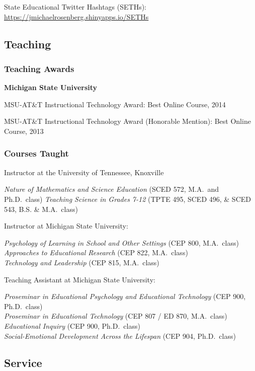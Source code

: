 \documentclass[]{article}
\begin{document}
State Educational Twitter Hashtags (SETHs):
\href{https://jmichaelrosenberg.shinyapps.io/SETHs/}{https://jmichaelrosenberg.shinyapps.io/SETHs}

\subsection{Teaching}\label{teaching}

\subsubsection{Teaching Awards}\label{teaching-awards}

\textbf{Michigan State University}

MSU-AT\&T Instructional Technology Award: Best Online Course, 2014

MSU-AT\&T Instructional Technology Award (Honorable Mention): Best
Online Course, 2013

\subsubsection{Courses Taught}\label{courses-taught}

Instructor at the University of Tennessee, Knoxville

\emph{Nature of Mathematics and Science Education} (SCED 572, M.A.~and
Ph.D.~class) \emph{Teaching Science in Grades 7-12} (TPTE 495, SCED 496,
\& SCED 543, B.S. \& M.A.~class)

Instructor at Michigan State University:

\emph{Psychology of Learning in School and Other Settings} (CEP 800,
M.A.~class)\\
\emph{Approaches to Educational Research} (CEP 822, M.A.~class)\\
\emph{Technology and Leadership} (CEP 815, M.A.~class)

Teaching Assistant at Michigan State University:

\emph{Proseminar in Educational Psychology and Educational Technology}
(CEP 900, Ph.D.~class)\\
\emph{Proseminar in Educational Technology} (CEP 807 / ED 870,
M.A.~class)\\
\emph{Educational Inquiry} (CEP 900, Ph.D.~class)\\
\emph{Social-Emotional Development Across the Lifespan} (CEP 904,
Ph.D.~class)

\subsection{Service}\label{service}
\end{document}

